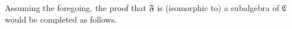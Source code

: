 \documentclass[a4paper,UKenglish,cleveref,autoref,thm-restate]{lipics-v2021}
\begin{document}
\ccpad
Assuming the foregoing, the proof that \af 𝔉 is (isomorphic to) a subalgebra of \af ℭ would be completed as follows.
\ccpad
\begin{code}%
\>[0][@{}l@{\AgdaIndent{1}}]%
\>[1]\AgdaSpace{}%
\AgdaSymbol{:}\AgdaSpace{}%
\AgdaSpace{}%
\AgdaSpace{}%
\AgdaSpace{}%
\AgdaSpace{}%
\AgdaSpace{}%
\AgdaSpace{}%
\AgdaSpace{}%
\<%
\\
%
\>[1]\AgdaSpace{}%
\AgdaSpace{}%
\AgdaSymbol{=}\AgdaSpace{}%
\AgdaSpace{}%
\AgdaSpace{}%
\AgdaSpace{}%
\AgdaOperator{\AgdaInductiveConstructor{,}}\AgdaSpace{}%
\AgdaSymbol{(}\AgdaSpace{}%
\AgdaOperator{\AgdaInductiveConstructor{,}}\AgdaSpace{}%
\AgdaSpace{}%
\AgdaSpace{}%
\AgdaSymbol{)}\<%
\\
\>[1][@{}l@{\AgdaIndent{0}}]%
\>[2]\<%
\\
\>[2][@{}l@{\AgdaIndent{0}}]%
\>[3]\AgdaSpace{}%
\AgdaSymbol{:}\AgdaSpace{}%
\AgdaSpace{}%
\AgdaSpace{}%
\AgdaSpace{}%
\<%
\\
%
\>[3]\AgdaSpace{}%
\AgdaSymbol{=}\AgdaSpace{}%
\AgdaSpace{}%
\AgdaSpace{}%
\AgdaSpace{}%
\AgdaSpace{}%
\AgdaSpace{}%
\<%
\end{code}
\end{document}
